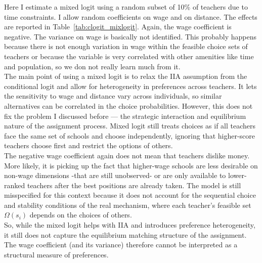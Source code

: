 \documentclass{article}
\begin{document}
Here I estimate a mixed logit using a random subset of 10\% of teachers due to time constraints. I allow random coefficients on wage and on distance. The effects are reported in Table~\ref{tab:clogit_mixlogit}. Again, the wage coefficient is negative. The variance on wage is basically not identified. This probably happens because there is not enough variation in wage within the feasible choice sets of teachers or because the variable is very correlated with other amenities like time and population, so we don not really learn much from it. \\

The main point of using a mixed logit is to relax the IIA assumption from the conditional logit and allow for heterogeneity in preferences across teachers. It lets the sensitivity to wage and distance vary across individuals, so similar alternatives can be correlated in the choice probabilities. However, this does not fix the problem I discussed before — the strategic interaction and equilibrium nature of the assignment process. Mixed logit still treats choices as if all teachers face the same set of schools and choose independently, ignoring that higher-score teachers choose first and restrict the options of others. \\

The negative wage coefficient again does not mean that teachers dislike money. More likely, it is picking up the fact that higher-wage schools are less desirable on non-wage dimensions -that are still unobserved- or are only available to lower-ranked teachers after the best positions are already taken. The model is still misspecified for this context because it does not account for the sequential choice and stability conditions of the real mechanism, where each teacher’s feasible set $\Omega(s_i)$ depends on the choices of others. \\

So, while the mixed logit helps with IIA and introduces preference heterogeneity, it still does not capture the equilibrium matching structure of the assignment. The wage coefficient (and its variance) therefore cannot be interpreted as a structural measure of preferences. 
\end{document}
